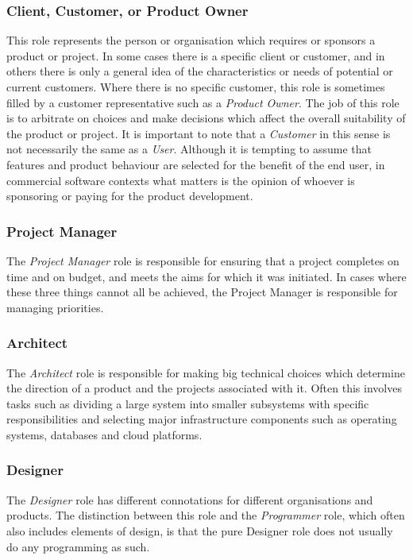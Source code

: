 \subsubsection{Client, Customer, or Product Owner}
This role represents the person or organisation which requires or sponsors a product or project. In some cases there is a specific client or customer, and in others there is only a general idea of the characteristics or needs of potential or current customers. Where there is no specific customer, this role is sometimes filled by a customer representative such as a \emph{Product Owner}. The job of this role is to arbitrate on choices and make decisions which affect the overall suitability of the product or project. It is important to note that a \emph{Customer} in this sense is not necessarily the same as a \emph{User}. Although it is tempting to assume that features and product behaviour are selected for the benefit of the end user, in commercial software contexts what matters is the opinion of whoever is sponsoring or paying for the product development.

\subsubsection{Project Manager}
The \emph{Project Manager} role is responsible for ensuring that a project completes on time and on budget, and meets the aims for which it was initiated. In cases where these three things cannot all be achieved, the Project Manager is responsible for managing priorities.

\subsubsection{Architect}
The \emph{Architect} role is responsible for making big technical choices which determine the direction of a product and the projects associated with it. Often this involves tasks such as dividing a large system into smaller subsystems with specific responsibilities and selecting major infrastructure components such as operating systems, databases and cloud platforms.

\subsubsection{Designer}
The \emph{Designer} role has different connotations for different organisations and products.  The distinction between this role and the \emph{Programmer} role, which often also includes elements of design, is that the pure Designer role does not usually do any programming as such.

